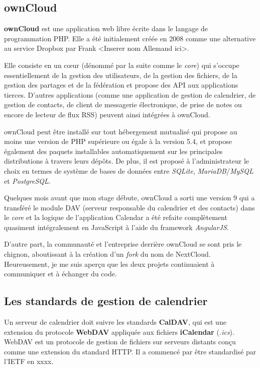 \documentclass[10pt,a4paper]{report}
\begin{document}
	\subsection{ownCloud}
	\textbf{ownCloud} est une application web libre écrite dans le langage de programmation PHP. Elle a été initialement créée en 2008 comme une alternative au service Dropbox par Frank <Inserer nom Allemand ici>.
	
	Elle consiste en un cœur (dénommé par la suite comme le \textit{core}) qui s'occupe essentiellement de la gestion des utilisateurs, de la gestion des fichiers, de la gestion des partages et de la fédération et propose des API aux applications tierces. D'autres applications (comme une application de gestion de calendrier, de gestion de contacts, de client de messagerie électronique, de prise de notes ou encore de lecteur de flux RSS) peuvent ainsi intégrées à ownCloud.
	
	ownCloud peut être installé sur tout hébergement mutualisé qui propose au moins une version de PHP supérieure ou égale à la version 5.4, et propose également des paquets installables automatiquement sur les principales distributions à travers leurs dépôts. De plus, il est proposé à l'administrateur le choix en termes de système de bases de données entre \textit{SQLite}, \textit{MariaDB}/\textit{MySQL} et \textit{PostgreSQL}.
	
	Quelques mois avant que mon stage débute, ownCloud a sorti une version 9 qui a transféré le module DAV (serveur responsable du calendrier et des contacts) dans le \textit{core} et la logique de l'application Calendar a été refaite complètement quasiment intégralement en JavaScript à l'aide du framework \textit{AngularJS}.
	
	D'autre part, la communauté et l'entreprise derrière ownCloud se sont pris le chignon, aboutissant à la création d'un \textit{fork} du nom de NextCloud. Heureusement, je me suis aperçu que les deux projets continuaient à communiquer et à échanger du code.
	
	\subsection{Les standards de gestion de calendrier}
	Un serveur de calendrier doit suivre les standards \textbf{CalDAV}, qui est une extension du protocole \textbf{WebDAV} appliquée aux fichiers \textbf{iCalendar} (\textit{.ics}). WebDAV est un protocole de gestion de fichiers sur serveurs distants conçu comme une extension du standard HTTP. Il a commencé par être standardisé par l'IETF en xxxx.
	
\end{document}
